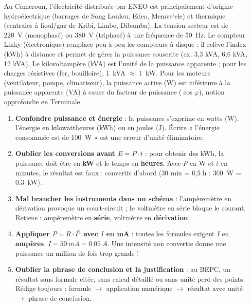 \documentclass[11pt]{article}
\newcommand{\cle}[1]{{\popxbold\color{popdark}#1}}
\begin{document}
\begin{savaistu}
Au Cameroun, l'électricité distribuée par ENEO est principalement d'origine \cle{hydroélectrique} (barrages de Song Loulou, Edea, Memve'ele) et \cle{thermique} (centrales à fioul/gaz de Kribi, Limbe, Dibamba). La tension secteur est de \SI{220}{V} (monophasé) ou \SI{380}{V} (triphasé) à une fréquence de \SI{50}{Hz}. Le compteur Linky (électronique) remplace peu à peu les compteurs à disque : il relève l'index (kWh) à distance et permet de gérer la puissance souscrite (ex. 3,3 kVA, 6,6 kVA, 12 kVA). Le \cle{kilovoltampère (kVA)} est l'unité de la puissance apparente ; pour les charges résistives (fer, bouilloire), \SI{1}{kVA} $\approx$ \SI{1}{kW}. Pour les moteurs (ventilateur, pompe, climatiseur), la puissance active (W) est inférieure à la puissance apparente (VA) à cause du \cle{facteur de puissance} ($\cos \varphi$), notion approfondie en Terminale.
\end{savaistu}

\begin{attention}
\begin{enumerate}
\item \textbf{Confondre puissance et énergie} : la puissance s'exprime en watts (W), l'énergie en kilowattheures (kWh) ou en joules (J). Écrire « l'énergie consommée est de \SI{100}{W} » est une erreur d'unité éliminatoire.
\item \textbf{Oublier les conversions avant $E = P \cdot t$} : pour obtenir des kWh, la puissance doit être en \textbf{kW} et le temps en \textbf{heures}. Avec $P$ en W et $t$ en minutes, le résultat est faux : convertis d'abord (30 min = 0,5 h ; \SI{300}{W} = \SI{0,3}{kW}).
\item \textbf{Mal brancher les instruments dans un schéma} : l'ampèremètre en dérivation provoque un court-circuit ; le voltmètre en série bloque le courant. Retiens : ampèremètre en \textbf{série}, voltmètre en \textbf{dérivation}.
\item \textbf{Appliquer $P = R \cdot I^{2}$ avec $I$ en mA} : toutes les formules exigent $I$ en \textbf{ampères}. $I = \SI{50}{mA} = \SI{0,05}{A}$. Une intensité non convertie donne une puissance un million de fois trop grande !
\item \textbf{Oublier la phrase de conclusion et la justification} : au BEPC, un résultat sans formule citée, sans calcul détaillé ou sans unité perd des points. Rédige toujours : formule $\rightarrow$ application numérique $\rightarrow$ résultat avec unité $\rightarrow$ phrase de conclusion.
\end{enumerate}
\end{attention}
\end{document}
